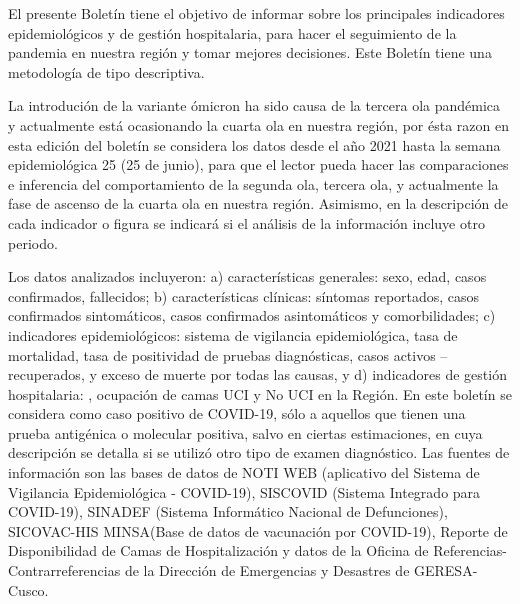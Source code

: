 \documentclass[12pt,a4paper,openany]{book}
\begin{document}
	
	
	\noindent El presente Boletín tiene el objetivo de informar sobre los principales indicadores epidemiológicos y
	de gestión hospitalaria, para hacer el seguimiento de la pandemia en nuestra región y tomar mejores decisiones. Este Boletín tiene una metodología de tipo descriptiva.
	
	
	La introdución de la variante ómicron ha sido causa de la tercera ola pandémica y actualmente está ocasionando la cuarta ola en nuestra región, por ésta razon en esta edición del boletín se considera los datos desde el año 2021 hasta la
	semana epidemiológica  25 (25 de junio), para que el lector pueda hacer las comparaciones
	e inferencia del comportamiento de la segunda ola, tercera ola, y actualmente la fase de ascenso de la cuarta ola
	en nuestra región. Asimismo, en la descripción de cada indicador o figura se indicará si el análisis de
	la información incluye otro periodo.
	
	
	Los datos analizados incluyeron: a) características generales: sexo, edad, casos confirmados,
	fallecidos; b) características clínicas: síntomas reportados, casos confirmados sintomáticos, casos
	confirmados asintomáticos y comorbilidades; c) indicadores epidemiológicos: sistema de vigilancia
	epidemiológica, tasa de mortalidad, tasa de positividad de pruebas diagnósticas, casos activos –
	recuperados, y exceso de muerte por todas las causas, y d) indicadores de gestión hospitalaria: ,
	ocupación de camas UCI y No UCI en la Región. En este boletín se considera como caso positivo de
	COVID-19, sólo a aquellos que tienen una prueba antigénica o molecular positiva, salvo en ciertas
	estimaciones, en cuya descripción se detalla si se utilizó otro tipo de examen diagnóstico.
	Las fuentes de información son las bases de datos de NOTI WEB (aplicativo del Sistema de
	Vigilancia Epidemiológica - COVID-19), SISCOVID (Sistema Integrado para COVID-19), SINADEF
	(Sistema Informático Nacional de Defunciones), SICOVAC-HIS MINSA(Base de datos de vacunación
	por COVID-19), Reporte de Disponibilidad de Camas de Hospitalización y datos de la Oficina de
	Referencias-Contrarreferencias de la Dirección de Emergencias y Desastres de GERESA-Cusco.
	
	
\end{document}
